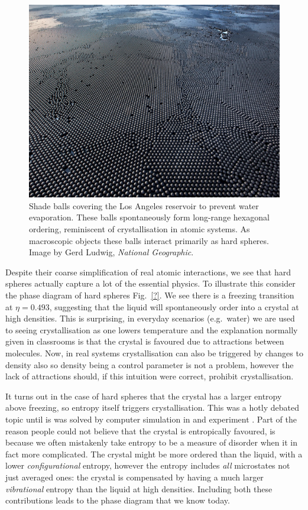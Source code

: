 \documentclass[11pt]{report}
\begin{document}
\begin{figure}
  \includegraphics[width=\linewidth]{shade-balls}
  \caption{
    Shade balls covering the Los Angeles reservoir to prevent water evaporation.
    These balls spontaneously form long-range hexagonal ordering, reminiscent of crystallisation in atomic systems.
    As macroscopic objects these balls interact primarily as hard spheres.
    Image by Gerd Ludwig, \emph{National Geographic}.}
  \label{fig:shade-balls}
\end{figure}

Despite their coarse simplification of real atomic interactions, we see that hard spheres actually capture a lot of the essential physics.
To illustrate this consider the phase diagram of hard spheres Fig.\ \ref{?}.
We see there is a freezing transition at $\eta = 0.493$, suggesting that the liquid will spontaneously order into a crystal at high densities.
This is surprising, in everyday scenarios (e.g.\ water) we are used to seeing crystallisation as one lowers temperature and the explanation normally given in classrooms is that the crystal is favoured due to attractions between molecules.
Now, in real systems crystallisation can also be triggered by changes to density also so density being a control parameter is not a problem, however the lack of attractions should, if this intuition were correct, prohibit crystallisation.

It turns out in the case of hard spheres that the crystal has a larger entropy above freezing, so entropy itself triggers crystallisation.
This was a hotly debated topic \cite{?,?,?} until is was solved by computer simulation in \cite{?,?,?} and experiment \cite{?,?,?}.
Part of the reason people could not believe that the crystal is entropically favoured, is because we often mistakenly take entropy to be a measure of disorder when it in fact more complicated.
The crystal might be more ordered than the liquid, with a lower \emph{configurational} entropy, however the entropy includes \emph{all} microstates not just averaged ones: the crystal is compensated by having a much larger \emph{vibrational} entropy than the liquid at high densities.
Including both these contributions leads to the phase diagram that we know today.
\end{document}
